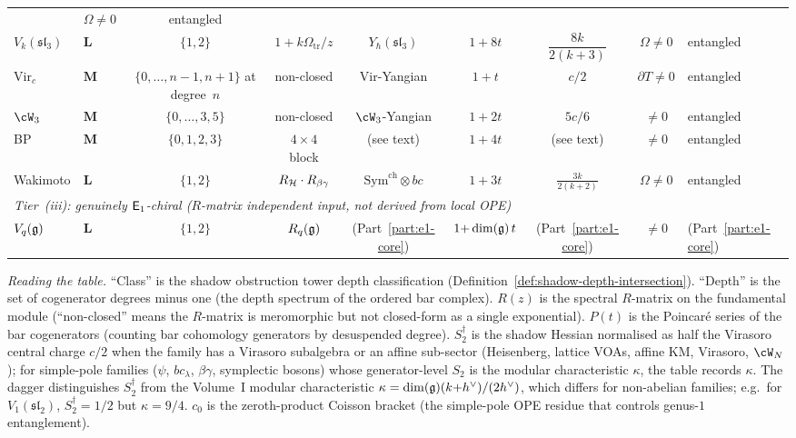 \begin{computation}
\begin{center}
\begin{tabular}{llccccccl}
 & $\Omega\ne 0$
 & entangled \\[5pt]
$V_k(\mathfrak{sl}_3)$
 & $\mathbf{L}$
 & $\{1,2\}$
 & $1{+}k\Omega_{\mathrm{tr}}/z$
 & $Y_\hbar(\mathfrak{sl}_3)$
 & $1{+}8t$
 & $\dfrac{8k}{2(k{+}3)}$
 & $\Omega\ne 0$
 & entangled \\[5pt]
$\mathrm{Vir}_c$
 & $\mathbf{M}$
 & $\{0,\ldots,n{-}1,n{+}1\}$ at degree~$n$
 & non-closed
 & Vir-Yangian
 & $1{+}t$
 & $c/2$
 & $\partial T\ne 0$
 & entangled \\[3pt]
$\cW_3$
 & $\mathbf{M}$
 & $\{0,\ldots,3,5\}$
 & non-closed
 & $\cW_3$-Yangian
 & $1{+}2t$
 & $5c/6$
 & $\ne 0$
 & entangled \\[3pt]
BP
 & $\mathbf{M}$
 & $\{0,1,2,3\}$
 & $4{\times}4$ block
 & (see text)
 & $1{+}4t$
 & (see text)
 & $\ne 0$
 & entangled \\[3pt]
Wakimoto
 & $\mathbf{L}$
 & $\{1,2\}$
 & $R_{\mathcal{H}} \cdot R_{\beta\gamma}$
 & $\mathrm{Sym}^{\mathrm{ch}} \otimes bc$
 & $1{+}3t$
 & $\frac{3k}{2(k{+}2)}$
 & $\Omega\ne 0$
 & entangled \\[3pt]
\midrule
\multicolumn{9}{l}{\textit{Tier~\textup{(iii)}: genuinely $\mathsf{E}_1$-chiral
 \textup{(}$R$-matrix independent input,
 not derived from local OPE\textup{)}}} \\[2pt]
$V_q(\mathfrak{g})$
 & $\mathbf{L}$
 & $\{1,2\}$
 & $R_q(\mathfrak{g})$
 & (Part~\ref{part:e1-core})
 & $1{+}\dim(\mathfrak{g})\,t$
 & (Part~\ref{part:e1-core})
 & $\ne 0$
 & (Part~\ref{part:e1-core}) \\
\bottomrule
\end{tabular}
\end{center}

\smallskip
\noindent
\emph{Reading the table.}
``Class'' is the shadow obstruction tower depth classification
(Definition~\ref{def:shadow-depth-intersection}).
``Depth'' is the set of cogenerator degrees minus one
(the depth spectrum of the ordered bar complex).
$R(z)$ is the spectral $R$-matrix on the fundamental
module (``non-closed'' means the $R$-matrix is
meromorphic but not closed-form as a single exponential).
$P(t)$ is the Poincar\'{e} series of the bar
cogenerators (counting bar cohomology generators by
desuspended degree).
$S_2^\dagger$ is the shadow Hessian
normalised as half the Virasoro central charge $c/2$
when the family has a Virasoro subalgebra or an
affine sub-sector (Heisenberg, lattice VOAs, affine KM,
Virasoro, $\cW_N$); for simple-pole families
($\psi$, $bc_\lambda$, $\beta\gamma$, symplectic bosons)
whose generator-level $S_2$ is the modular characteristic
$\kappa$, the table records $\kappa$. The dagger
distinguishes $S_2^\dagger$ from the Volume~I modular
characteristic $\kappa = \dim(\mathfrak{g})(k{+}h^\vee)/(2h^\vee)$,
which differs for non-abelian families; e.g.\ for
$V_1(\mathfrak{sl}_2)$, $S_2^\dagger = 1/2$ but
$\kappa = 9/4$.
$c_0$ is the zeroth-product Coisson bracket
(the simple-pole OPE residue that controls genus-$1$
entanglement).


\end{computation}
